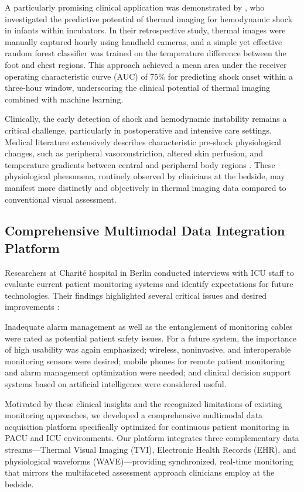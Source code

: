 A particularly promising clinical application was demonstrated by \citet{predicting_shock_from_thermal_images}, who investigated the predictive potential of thermal imaging for hemodynamic shock in infants within incubators. In their retrospective study, thermal images were manually captured hourly using handheld cameras, and a simple yet effective random forest classifier was trained on the temperature difference between the foot and chest regions. This approach achieved a mean area under the receiver operating characteristic curve (AUC) of 75\% for predicting shock onset within a three-hour window, underscoring the clinical potential of thermal imaging combined with machine learning.

Clinically, the early detection of shock and hemodynamic instability remains a critical challenge, particularly in postoperative and intensive care settings. Medical literature extensively describes characteristic pre-shock physiological changes, such as peripheral vasoconstriction, altered skin perfusion, and temperature gradients between central and peripheral body regions \citep{Shock}. These physiological phenomena, routinely observed by clinicians at the bedside, may manifest more distinctly and objectively in thermal imaging data compared to conventional visual assessment.

\subsection{Comprehensive Multimodal Data Integration Platform}

Researchers at Charité hospital in Berlin conducted interviews with ICU staff to evaluate current patient monitoring systems and identify expectations for future technologies. Their findings highlighted several critical issues and desired improvements \citep{poncette2019clinical}:

\begin{displayquote}
  Inadequate alarm management as well as the entanglement of monitoring cables were rated as potential patient safety issues. For a future system, the importance of high usability was again emphasized; wireless, noninvasive, and interoperable monitoring sensors were desired; mobile phones for remote patient monitoring and alarm management optimization were needed; and clinical decision support systems based on artificial intelligence were considered useful.
\end{displayquote}

Motivated by these clinical insights and the recognized limitations of existing monitoring approaches, we developed a comprehensive multimodal data acquisition platform specifically optimized for continuous patient monitoring in PACU and ICU environments. Our platform integrates three complementary data streams—Thermal Visual Imaging (TVI), Electronic Health Records (EHR), and physiological waveforms (WAVE)—providing synchronized, real-time monitoring that mirrors the multifaceted assessment approach clinicians employ at the bedside.

